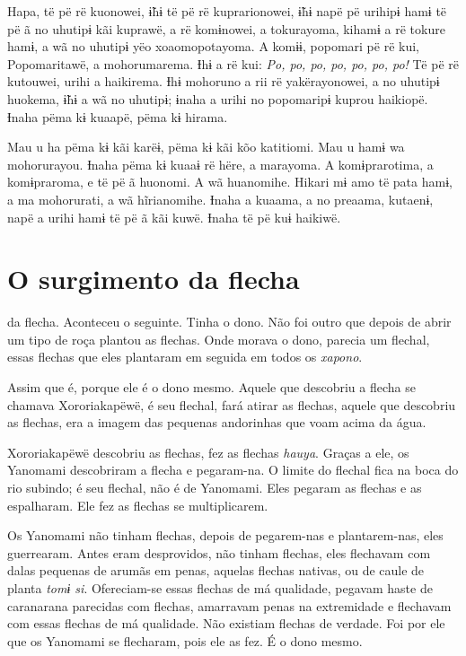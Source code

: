 Hapa, të pë rë kuonowei, ɨ̃hɨ të pë rë kuprarionowei, ɨ̃hɨ napë pë urihipɨ
hamɨ të pë ã no uhutipɨ kãi kuprawë, a rë komɨnowei, a tokurayoma,
kihamɨ a rë tokure hamɨ, a wã no uhutipɨ yëo xoaomopotayoma. A komɨɨ,
popomari pë rë kui, Popomaritawë, a mohorumarema. Ɨhɨ a rë kui: \textit{Po, po,
po, po, po, po, po!} Të pë rë kutouwei, urihi a haikirema. Ɨhɨ mohoruno a
rii rë yakërayonowei, a no uhutipɨ huokema, ɨ̃hɨ a wã no uhutipɨ; ɨnaha a
urihi no popomaripɨ kuprou haikiopë. Ɨnaha pëma kɨ kuaapë, pëma kɨ
hirama. 

Mau u ha pëma kɨ kãi karëɨ, pëma kɨ kãi kõo katitiomi. Mau u hamɨ wa
mohorurayou. Ɨnaha pëma kɨ kuaaɨ rë hëre, a marayoma. A komɨprarotima, a
komɨpraroma, e të pë ã huonomi. A wã huanomihe. Hikari mɨ amo të pata
hamɨ, a ma mohorurati, a wã hĩrianomihe. Ɨnaha a kuaama, a no preaama,
kutaenɨ, napë a urihi hamɨ të pë ã kãi kuwë. Ɨnaha të pë kuɨ haikiwë.

\chapter{O surgimento da flecha}

 da flecha. Aconteceu o seguinte. Tinha o dono. Não foi outro
que depois de abrir um tipo de roça plantou as flechas. Onde morava o
dono, parecia um flechal, essas flechas que eles plantaram em seguida em
todos os \textit{xapono}.

Assim que é, porque ele é o dono mesmo. Aquele que descobriu a flecha se
chamava Xororiakapëwë, é seu flechal, fará atirar as flechas, aquele que
descobriu as flechas, era a imagem das pequenas andorinhas que voam
acima da água. 

Xororiakapëwë descobriu as flechas, fez as flechas \textit{hauya}. Graças
a ele, os Yanomami descobriram a flecha e pegaram-na. O limite do
flechal fica na boca do rio subindo; é seu flechal, não é de Yanomami.
Eles pegaram as flechas e as espalharam. Ele fez as flechas se
multiplicarem. 

Os Yanomami não tinham flechas, depois de pegarem-nas e plantarem-nas,
eles guerrearam. Antes eram desprovidos, não tinham flechas, eles
flechavam com dalas pequenas de arumãs em penas, aquelas flechas nativas,
ou de caule de planta \textit{tomɨ si}. Ofereciam-se essas flechas de má
qualidade, pegavam haste de caranarana parecidas com flechas, amarravam
penas na extremidade e flechavam com essas flechas de má qualidade. Não
existiam flechas de verdade. Foi por ele que os Yanomami se flecharam,
pois ele as fez. É o dono mesmo. 

